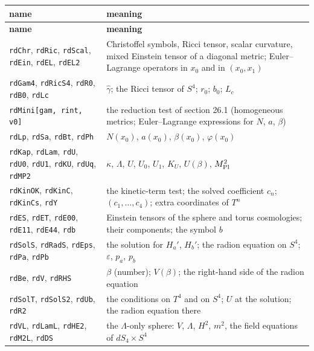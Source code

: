 \documentclass[10pt,a4paper]{article}
\begin{document}
{\footnotesize
\begin{longtable}{>{\raggedright\arraybackslash}p{}>{\raggedright\arraybackslash}p{}}
\toprule
\textbf{name} & \textbf{meaning} \\
\midrule\endfirsthead
\toprule
\textbf{name} & \textbf{meaning} \\
\midrule\endhead
\endfoot
\bottomrule\endlastfoot
\texttt{rdChr}, \texttt{rdRic}, \texttt{rdScal}, \texttt{rdEin}, \texttt{rdEL}, \texttt{rdEL2} & Christoffel symbols, Ricci tensor, scalar curvature, mixed Einstein tensor of a diagonal metric; Euler–Lagrange operators in $x_0$ and in $(x_0,x_1)$ \\
\texttt{rdGam4}, \texttt{rdRicS4}, \texttt{rdR0}, \texttt{rdB0}, \texttt{rdLc} & $\hat\gamma$; the Ricci tensor of $S^4$; $r_0$; $b_0$; $L_c$ \\
\texttt{rdMini[gam, rint, v0]} & the reduction test of section 26.1 (homogeneous metrics; Euler–Lagrange expressions for $N$, $a$, $\beta$) \\
\texttt{rdLp}, \texttt{rdSa}, \texttt{rdBt}, \texttt{rdPh} & $N(x_0)$, $a(x_0)$, $\beta(x_0)$, $\varphi(x_0)$ \\
\texttt{rdKap}, \texttt{rdLam}, \texttt{rdU}, \texttt{rdU0}, \texttt{rdU1}, \texttt{rdKU}, \texttt{rdUq}, \texttt{rdMP2} & $\kappa$, $\Lambda$, $U$, $U_0$, $U_1$, $K_U$, $U(\beta)$, $M_{\rm Pl}^2$ \\
\texttt{rdKinOK}, \texttt{rdKinC}, \texttt{rdKinCs}, \texttt{rdY} & the kinetic-term test; the solved coefficient $c_n$; $(c_1,\dots,c_4)$; extra coordinates of $T^n$ \\
\texttt{rdES}, \texttt{rdET}, \texttt{rdE00}, \texttt{rdE11}, \texttt{rdE44}, \texttt{rdb} & Einstein tensors of the sphere and torus cosmologies; their components; the symbol $b$ \\
\texttt{rdSolS}, \texttt{rdRadS}, \texttt{rdEps}, \texttt{rdPa}, \texttt{rdPb} & the solution for $H_a'$, $H_b'$; the radion equation on $S^4$; $\varepsilon$, $p_a$, $p_b$ \\
\texttt{rdBe}, \texttt{rdV}, \texttt{rdRHS} & $\beta$ (number); $V(\beta)$; the right-hand side of the radion equation \\
\texttt{rdSolT}, \texttt{rdSolS2}, \texttt{rdUb}, \texttt{rdR2} & the conditions on $T^4$ and on $S^4$; $U$ at the solution; the radion equation there \\
\texttt{rdVL}, \texttt{rdLamL}, \texttt{rdHE2}, \texttt{rdM2L}, \texttt{rdDS} & the \texorpdfstring{\ensuremath{\Lambda}}{Λ}-only sphere: $V$, $\Lambda$, $H^2$, $m^2$, the field equations of $dS_4\times S^4$ \\

\end{longtable}}
\end{document}
